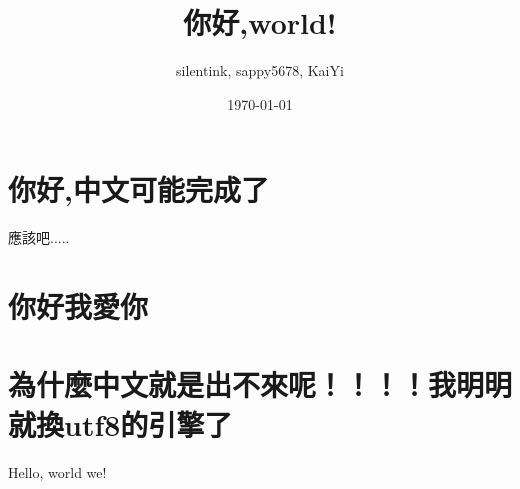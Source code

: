 \documentclass[UTF8,12pt,a4paper]{article}
\title{你好,world!}
\author{silentink, sappy5678, KaiYi}
\date{\today}
\begin{document}
\maketitle
\section{你好,中文可能完成了}
應該吧.....
\section{你好我愛你}

\section{為什麼中文就是出不來呢！！！！我明明就換utf8的引擎了}
Hello, world we!
\end{document}
